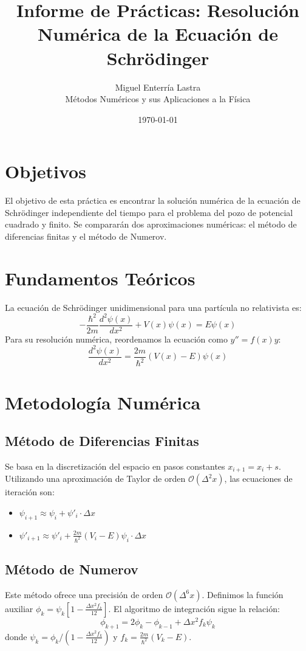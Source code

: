 \documentclass[11pt,a4paper]{article}
\title{Informe de Prácticas: Resolución Numérica de la Ecuación de Schrödinger}
\author{Miguel Enterría Lastra \\ \small Métodos Numéricos y sus Aplicaciones a la Física}
\date{\today}
\begin{document}
\maketitle

\section{Objetivos}
El objetivo de esta práctica es encontrar la solución numérica de la ecuación de Schrödinger independiente del tiempo para el problema del pozo de potencial cuadrado y finito. Se compararán dos aproximaciones numéricas: el método de diferencias finitas y el método de Numerov.

\section{Fundamentos Teóricos}
La ecuación de Schrödinger unidimensional para una partícula no relativista es:
\begin{equation}
-\frac{\hbar^{2}}{2m}\frac{d^{2}\psi(x)}{dx^{2}}+V(x)\psi(x)=E\psi(x)
\end{equation}
Para su resolución numérica, reordenamos la ecuación como $y'' = f(x)y$:
\begin{equation}
\frac{d^{2}\psi(x)}{dx^{2}}=\frac{2m}{\hbar^{2}}(V(x)-E)\psi(x)
\end{equation}

\section{Metodología Numérica}

\subsection{Método de Diferencias Finitas}
Se basa en la discretización del espacio en pasos constantes $x_{i+1} = x_i + s$. Utilizando una aproximación de Taylor de orden $\mathcal{O}(\Delta^2 x)$, las ecuaciones de iteración son:
\begin{itemize}
    \item $\psi_{i+1} \approx \psi_i + \psi'_i \cdot \Delta x$
    \item $\psi'_{i+1} \approx \psi'_i + \frac{2m}{\hbar^2}(V_i - E)\psi_i \cdot \Delta x$
\end{itemize}

\subsection{Método de Numerov}
Este método ofrece una precisión de orden $\mathcal{O}(\Delta^6 x)$. Definimos la función auxiliar $\phi_k = \psi_k [1 - \frac{\Delta x^2 f_k}{12}]$. El algoritmo de integración sigue la relación:
\begin{equation}
\phi_{k+1} = 2\phi_k - \phi_{k-1} + \Delta x^2 f_k \psi_k
\end{equation}
donde $\psi_k = \phi_k / (1 - \frac{\Delta x^2 f_k}{12})$ y $f_k = \frac{2m}{\hbar^2}(V_k - E)$.
\end{document}
